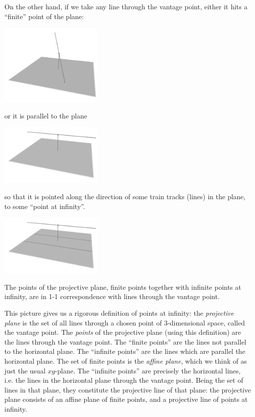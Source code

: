 On the other hand, if we take any line through the vantage point, either it hits a ``finite'' point of the plane:
\begin{center}
\includegraphics[width=5cm]{above-the-plane-connect}
\end{center}
or it is parallel to the plane
\begin{center}
\includegraphics[width=5cm]{above-the-plane-off-to-infinity}
\end{center}
so that it is pointed along the direction of some train tracks (lines) in the plane, to some ``point at infinity''.
\begin{center}
\includegraphics[width=5cm]{above-the-plane-3}
\end{center}
The points of the projective plane, finite points together with infinite points at infinity, are in 1-1 correspondence with lines through the vantage point.

This picture gives us a rigorous definition of points at infinity: the \emph{projective plane} is the set of all lines through a chosen point of \(3\)-dimensional space, called the vantage point.
The \emph{points} of the projective plane (using this definition) are the lines through the vantage point.
The ``finite points'' are the lines not parallel to the horizontal plane.
The ``infinite points'' are the lines which are parallel the horizontal plane.
The set of finite points is the \emph{affine plane}, which we think of as just the usual \(xy\)-plane.
The ``infinite points'' are precisely the horizontal lines, i.e. the lines in the horizontal plane through the vantage point. 
Being the set of lines in that plane, they constitute the projective line of that plane: the projective plane consists of an affine plane of finite points, and a projective line of points at infinity.

